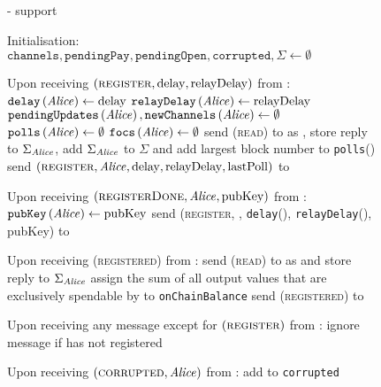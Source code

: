   \begin{figure}[H]
    \begin{systembox}{\fpaynet - support}
      \begin{algorithmic}[1]
        \State Initialisation:
        \Indent
          \State $\mathtt{channels}, \mathtt{pendingPay}, \mathtt{pendingOpen},
          \mathtt{corrupted}, \Sigma \gets \emptyset$
        \EndIndent
        \Statex

        \State Upon receiving $\left(\textsc{register}, \mathrm{delay},
        \mathrm{relayDelay}\right)$ from \alice:
        \Indent
          \State $\mathtt{delay}\left(\mathit{Alice}\right) \gets \mathrm{delay}$
          \State $\mathtt{relayDelay}\left(\mathit{Alice}\right) \gets
          \mathrm{relayDelay}$
          \State $\mathtt{pendingUpdates}\left(\mathit{Alice}\right),
          \mathtt{newChannels}\left(\mathit{Alice}\right) \gets \emptyset$
          \State $\mathtt{polls}\left(\mathit{Alice}\right) \gets \emptyset$
          \State $\mathtt{focs}\left(\mathit{Alice}\right) \gets \emptyset$
          \State send (\textsc{read}) to \ledger{} as \alice{}, store reply to
          $\Sigma_{\mathit{Alice}}$, add $\Sigma_{\mathit{Alice}}$ to $\Sigma$ and add largest
          block number to \texttt{polls}(\alice)
          \label{alg:fpaynet:support:lastpoll}
          \State send $\left(\textsc{register}, \mathit{Alice}, \mathrm{delay},
          \mathrm{relayDelay}, \mathrm{lastPoll}\right)$ to \simulator
        \EndIndent
        \Statex

        \State Upon receiving $\left(\textsc{registerDone}, \mathit{Alice},
        \mathrm{pubKey}\right)$ from \simulator:
        \Indent
          \State $\mathtt{pubKey}\left(\mathit{Alice}\right) \gets \mathrm{pubKey}$
          \State send (\textsc{register}, \alice, \texttt{delay}(\alice),
          \texttt{relayDelay}(\alice), pubKey) to \alice
        \EndIndent
        \Statex

        \State Upon receiving (\textsc{registered}) from \alice:
        \Indent
          \State send (\textsc{read}) to \ledger{} as \alice{} and store reply
          to $\Sigma_{\mathit{Alice}}$
          \State assign the sum of all output values that are exclusively
          spendable by \alice{} to \texttt{onChainBalance}
          \State send (\textsc{registered}) to \alice
        \EndIndent
        \Statex

        \State Upon receiving any message except for
        $\left(\textsc{register}\right)$ from \alice:
        \Indent
          \State ignore message if \alice{} has not registered
        \EndIndent
        \Statex

        \State Upon receiving $\left(\textsc{corrupted}, \mathit{Alice}\right)$ from
        \simulator:
        \Indent
          \State add \alice{} to \texttt{corrupted}
        \EndIndent
      \end{algorithmic}
    \end{systembox}
    \caption{}
    \label{alg:fpaynet:support}
  \end{figure}

